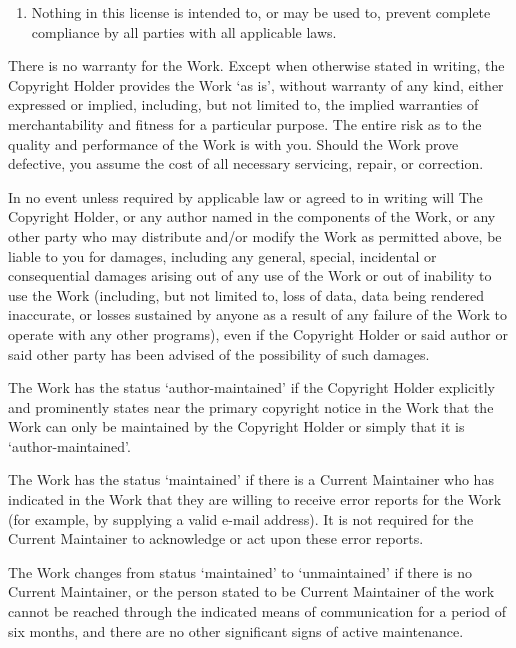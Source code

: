 \begin{LPPLicense}
\begin{enumerate}
  \item Nothing in this license is intended to, or may be used to,
    prevent complete compliance by all parties with all applicable
    laws.
  \end{enumerate}

  \label{LPPL:Warranty}

  There is no warranty for the Work.  Except when otherwise stated in
  writing, the Copyright Holder provides the Work `as is', without
  warranty of any kind, either expressed or implied, including, but
  not limited to, the implied warranties of merchantability and
  fitness for a particular purpose.  The entire risk as to the quality
  and performance of the Work is with you.  Should the Work prove
  defective, you assume the cost of all necessary servicing, repair,
  or correction.

  In no event unless required by applicable law or agreed to in
  writing will The Copyright Holder, or any author named in the
  components of the Work, or any other party who may distribute and/or
  modify the Work as permitted above, be liable to you for damages,
  including any general, special, incidental or consequential damages
  arising out of any use of the Work or out of inability to use the
  Work (including, but not limited to, loss of data, data being
  rendered inaccurate, or losses sustained by anyone as a result of
  any failure of the Work to operate with any other programs), even if
  the Copyright Holder or said author or said other party has been
  advised of the possibility of such damages.

  \label{LPPL:Maintenance}

  The Work has the status `author-maintained' if the Copyright Holder
  explicitly and prominently states near the primary copyright notice
  in the Work that the Work can only be maintained by the Copyright
  Holder or simply that it is `author-maintained'.

  The Work has the status `maintained' if there is a Current
  Maintainer who has indicated in the Work that they are willing to
  receive error reports for the Work (for example, by supplying a
  valid e-mail address). It is not required for the Current Maintainer
  to acknowledge or act upon these error reports.

  The Work changes from status `maintained' to `unmaintained' if there
  is no Current Maintainer, or the person stated to be Current
  Maintainer of the work cannot be reached through the indicated means
  of communication for a period of six months, and there are no other
  significant signs of active maintenance.


\end{LPPLicense}
